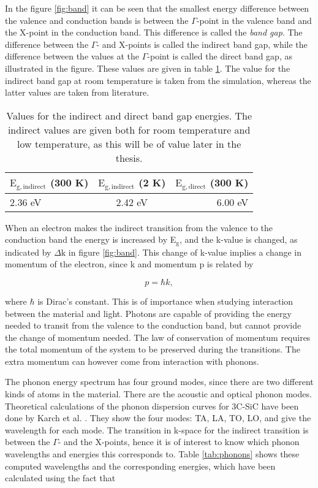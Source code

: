 In the figure \ref{fig:band} it can be seen that the smallest energy difference between the valence and conduction bands is between the $\Gamma$-point in the valence band and the X-point in the conduction band. This difference is called the \emph{band gap}. The difference between the $\Gamma$- and X-points is called the indirect band gap, while the difference between the values at the $\Gamma$-point is called the direct band gap, as illustrated in the figure. These values are given in table \ref{tab:eg}. The value for the indirect band gap at room temperature is taken from the simulation, whereas the latter values are taken from literature. 

\begin{table}[h]
\caption{Values for the indirect and direct band gap energies. The indirect values are given both for room temperature and low temperature, as this will be of value later in the thesis.}
\label{tab:eg}
\begin{center}
\begin{tabular}{ l c r }
  \hline                       
  \hline       
  \vspace{1mm}
    $\mathrm{E_{g,indirect}}$  (300 K) & $\mathrm{E_{g,indirect}}$ (2 K) & $\mathrm{E_{g,direct}}$  (300 K)\\
    \hline
  2.36 eV & 2.42 eV \cite{Bimberg1981} & 6.00 eV \cite{Dalven1965}\\
  \hline  
\end{tabular}
\end{center}
\end{table}

When an electron makes the indirect transition from the valence to the conduction band the energy is increased by E$_\mathrm{g}$, and the k-value is changed, as indicated by $\Delta \mathrm{k}$ in figure \ref{fig:band}. This change of k-value implies a change in momentum of the electron, since k and momentum p is related by

\[p = \hbar k,\]

\noindent where $\hbar$ is Dirac's constant. This is of importance when studying interaction between the material and light. Photons are capable of providing the energy needed to transit from the valence to the conduction band, but cannot provide the change of momentum needed. The law of conservation of momentum requires the total momentum of the system to be preserved during the transitions. The extra momentum can however come from interaction with phonons. 

The phonon energy spectrum has four ground modes, since there are two different kinds of atoms in the material. There are the acoustic and optical phonon modes. Theoretical calculations of the phonon dispersion curves for 3C-SiC have been done by Karch et al. \cite{Karch1994}. They show the four modes: TA, LA, TO, LO, and give the wavelength for each mode. The transition in k-space for the indirect transition is between the $\Gamma$- and the X-points, hence it is of interest to know which phonon wavelengths and energies this corresponds to.  Table \ref{tab:phonons} shows these computed wavelengths and the corresponding energies, which have been calculated using the fact that

